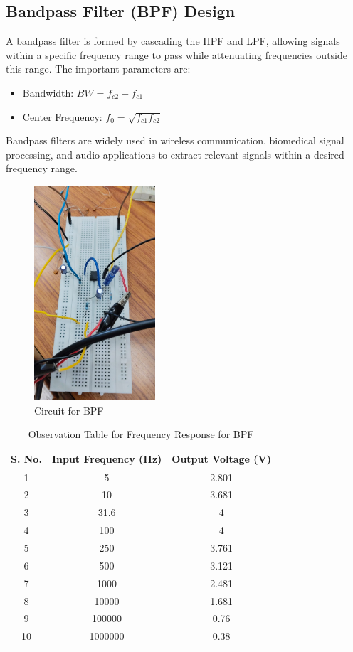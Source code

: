 \documentclass[a4paper,12pt]{article}
\begin{document}
\subsection{Bandpass Filter (BPF) Design}
A bandpass filter is formed by cascading the HPF and LPF, allowing signals within a specific frequency range to pass while attenuating frequencies outside this range. The important parameters are:
\begin{itemize}
    \item Bandwidth: $BW = f_{c2} - f_{c1}$
    \item Center Frequency: $f_0 = \sqrt{f_{c1} f_{c2}}$
\end{itemize}
Bandpass filters are widely used in wireless communication, biomedical signal processing, and audio applications to extract relevant signals within a desired frequency range.
\begin{figure}[H]
    \centering
    \includegraphics[width=0.4\textwidth]{figs/bpf_circuit.jpeg}
    \caption{Circuit for BPF}
\end{figure}
\begin{table}[H]
    \centering
    \renewcommand{\arraystretch}{1.3} %
    \begin{tabular}{|c|c|c|}
        \hline
        \textbf{S. No.} & \textbf{Input Frequency (Hz)} &\textbf{Output Voltage (V)} \\
        \hline
        1 & 5 & 2.801  \\
        2 & 10 & 3.681  \\
        3 & 31.6 & 4  \\
        4 & 100 & 4  \\
        5 & 250 & 3.761  \\
        6 & 500 & 3.121  \\
        7 & 1000 & 2.481  \\
        8 & 10000 & 1.681  \\
        9 & 100000 & 0.76  \\
        10 & 1000000 & 0.38  \\
        \hline
    \end{tabular}
    \caption{Observation Table for Frequency Response for BPF}
    \label{tab:observation}
\end{table}
\end{document}
